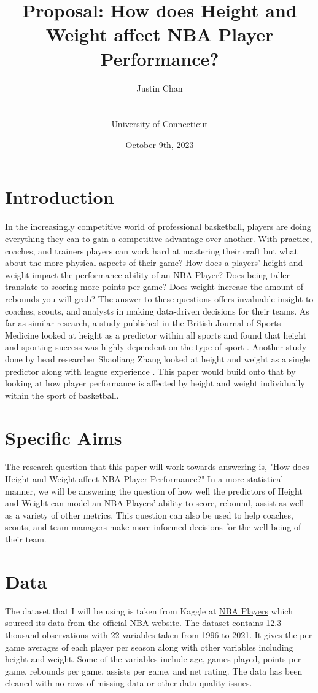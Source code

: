 \documentclass[12pt]{article}
\title{Proposal: How does Height and Weight affect NBA Player Performance?}
\author{Justin Chan\\
  \date{October 9th, 2023}\\
  University of Connecticut
}
\begin{document}
\maketitle

\section{Introduction}
In the increasingly competitive world of professional basketball, players are doing everything they can to 
gain a competitive advantage over another. With practice, coaches, and trainers players can work hard at 
mastering their craft but what about the more physical aspects of their game? How does a players' height
and weight impact the performance ability of an NBA Player? Does being taller translate to scoring more 
points per game? Does weight increase the amount of rebounds you will grab? The answer to these 
questions offers invaluable insight to coaches, scouts, and analysts in making data-driven decisions for their 
teams. As far as similar research, a study published in the British Journal of Sports Medicine looked at height
as a predictor within all sports and found that height and sporting success was highly dependent on the type
of sport \citep{tucker2012makes}. Another study done by head researcher Shaoliang Zhang looked at height and 
weight as a single predictor along with league experience \citep{zhang2017performance}. This paper would 
build onto that by looking at how player performance is affected by height and weight individually within the
sport of basketball.

\section{Specific Aims}
The research question that this paper will work towards answering is, "How does Height and Weight affect
NBA Player Performance?" In a more statistical manner, we will be answering the question of how well the 
predictors of Height and Weight can model an NBA Players' ability to score, rebound, assist as well as a variety
of other metrics. This question can also be used to help coaches, scouts, and team managers make more 
informed decisions for the well-being of their team.

\section{Data}

The dataset that I will be using is taken from Kaggle at \href{https://www.kaggle.com/datasets/justinas/nba-players-data}{NBA Players} 
which sourced its data from the official NBA website. The dataset contains 12.3 thousand observations with 
22 variables taken from 1996 to 2021. It gives the per game averages of each player per season along with
other variables including height and weight. Some of the variables include age, games  played, points per game, 
rebounds per game, assists per game, and net rating. The data has been cleaned with no rows of missing data 
or other data quality issues.
\end{document}
